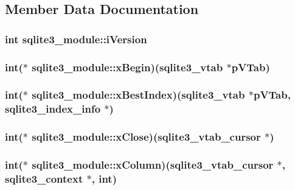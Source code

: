 \subsection{Member Data Documentation}
\hypertarget{structsqlite3__module_a42b11d080dc205aea43581b18f925afe}{
\subsubsection[{i\-Version}]{\setlength{\rightskip}{0pt plus 5cm}int sqlite3\-\_\-module\-::i\-Version}}\label{structsqlite3__module_a42b11d080dc205aea43581b18f925afe}
\hypertarget{structsqlite3__module_af3ea97df2b110da6ceb4797222e6d86f}{
\subsubsection[{x\-Begin}]{\setlength{\rightskip}{0pt plus 5cm}int($\ast$ sqlite3\-\_\-module\-::x\-Begin)({\bf sqlite3\-\_\-vtab} $\ast$p\-V\-Tab)}}\label{structsqlite3__module_af3ea97df2b110da6ceb4797222e6d86f}
\hypertarget{structsqlite3__module_a66577e230ca8de525b30ee6f287eafb1}{
\subsubsection[{x\-Best\-Index}]{\setlength{\rightskip}{0pt plus 5cm}int($\ast$ sqlite3\-\_\-module\-::x\-Best\-Index)({\bf sqlite3\-\_\-vtab} $\ast$p\-V\-Tab, {\bf sqlite3\-\_\-index\-\_\-info} $\ast$)}}\label{structsqlite3__module_a66577e230ca8de525b30ee6f287eafb1}
\hypertarget{structsqlite3__module_a514c66634a5297ca9879947fa6f8f10f}{
\subsubsection[{x\-Close}]{\setlength{\rightskip}{0pt plus 5cm}int($\ast$ sqlite3\-\_\-module\-::x\-Close)({\bf sqlite3\-\_\-vtab\-\_\-cursor} $\ast$)}}\label{structsqlite3__module_a514c66634a5297ca9879947fa6f8f10f}
\hypertarget{structsqlite3__module_a4c82dc60335ba40c816cdd6c4dce2950}{
\subsubsection[{x\-Column}]{\setlength{\rightskip}{0pt plus 5cm}int($\ast$ sqlite3\-\_\-module\-::x\-Column)({\bf sqlite3\-\_\-vtab\-\_\-cursor} $\ast$, {\bf sqlite3\-\_\-context} $\ast$, int)}}\label{structsqlite3__module_a4c82dc60335ba40c816cdd6c4dce2950}
